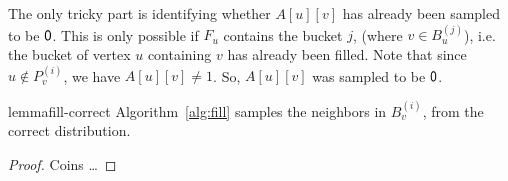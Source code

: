 The only tricky part is identifying whether $A[u][v]$
has already been sampled to be $\mathsf{0}$.
This is only possible if $F_u$ contains the bucket $j$, (where $v\in B_u^{(j)}$),
i.e. the bucket of vertex $u$ containing $v$ has already been filled.
Note that since $u\not\in P_v^{(i)}$, we have $A[u][v]\not=1$.
So, $A[u][v]$ was sampled to be $\mathsf{0}$.
\begin{restatable}{lemma}{fill-correct}
\label{lem:fill_correct}
Algorithm~\ref{alg:fill} samples the neighbors in $B_v^{(i)}$,
from the correct distribution.
\end{restatable}
\begin{proof}
Coins \ldots
\end{proof}
\fi

